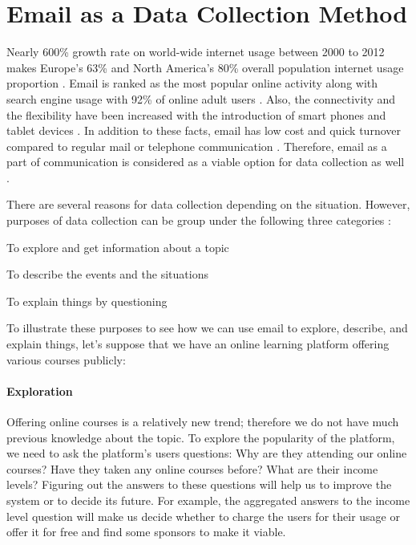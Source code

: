 \section{Email as a Data Collection Method}
\label{sec:1:EmailDataCol}

Nearly 600\% growth rate on world-wide internet usage between 2000 to 2012 makes Europe's 63\% and North America's 80\% overall population internet usage proportion \citep{InternetWorldStats2012}. Email is ranked as the most popular online activity along with search engine usage with 92\% of online adult users \citep{Purcell2011}. Also, the connectivity and the flexibility have been increased with the introduction of smart phones and tablet devices \citep{Madden2008}. In addition to these facts, email has low cost and quick turnover compared to regular mail or telephone communication \citep{Zikmund2007}. Therefore, email as a part of communication is considered as a viable option for data collection as well \citep{Zikmund2007}.
\vspace{1cm}

There are several reasons for data collection depending on the situation. However, purposes of data collection can be group under the following three categories \citep{Sue2011} \citep[pages 92--94]{Babbie2010}:

\begin{compactenum}
	\item To explore and get information about a topic
	\item To describe the events and the situations
	\item To explain things by questioning
\end{compactenum}

To illustrate these purposes to see how we can use email to explore, describe, and explain things, let's suppose that we have an online learning platform offering various courses publicly:

\paragraph{Exploration}
Offering online courses is a relatively new trend; therefore we do not have much previous knowledge about the topic. To explore the popularity of the platform, we need to ask the platform's users questions: Why are they attending our online courses? Have they taken any online courses before? What are their income levels? Figuring out the answers to these questions will help us to improve the system or to decide its future. For example, the aggregated answers to the income level question will make us decide whether to charge the users for their usage or offer it for free and find some sponsors to make it viable.

